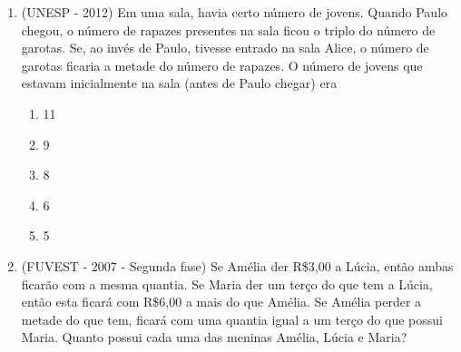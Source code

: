 \documentclass[a4paper,12pt]{article}
\begin{document}
\begin{enumerate}
    
    \item (UNESP - 2012) Em uma sala, havia certo número de jovens. Quando Paulo chegou, o número de rapazes presentes na sala ficou o triplo do número de garotas. Se, ao invés de Paulo, tivesse entrado na sala Alice, o número de garotas ficaria a metade do número de rapazes. O número de jovens que estavam inicialmente na sala (antes de Paulo chegar) era

     \begin{enumerate}
        \item 11
		\item 9
		\item 8
		\item 6
        \item 5
		\end{enumerate}
        
        
    
            
    \item (FUVEST - 2007 - Segunda fase) Se Amélia der R\$3,00 a Lúcia, então ambas ficarão com a mesma quantia. Se Maria der um terço do que tem a Lúcia, então esta ficará com R\$6,00 a mais do que Amélia. Se Amélia perder a metade do que tem, ficará com uma quantia igual a um terço do que possui Maria. Quanto possui cada uma das meninas Amélia, Lúcia e Maria?
        
 
 

\end{enumerate}
\end{document}
